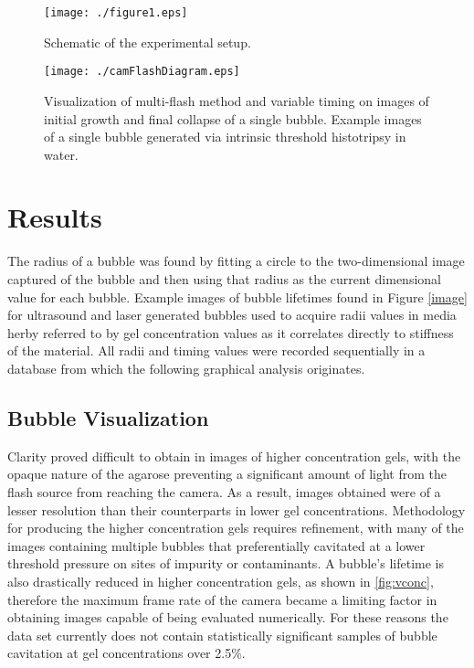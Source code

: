 \documentclass[prl,aps,epsf,twocolumn,superscriptaddress]{revtex4-1}
\begin{document}
\begin{figure}[ht!]
	\begin{center} 
		\texttt{[image: ./figure1.eps]} 
	\end{center}
	\caption{Schematic of the experimental setup.}
	\label{fig:setup}
\end{figure}

\begin{figure}[ht!]
	\begin{center} 
		\texttt{[image: ./camFlashDiagram.eps]} 
	\end{center}
	\caption{Visualization of multi-flash method and variable timing on images of initial growth and final collapse of a single bubble. Example images of a single bubble generated via intrinsic threshold histotripsy in water.}
	\label{fig:camFlash}
\end{figure}

\section{Results}
The radius of a bubble was found by fitting a circle to the two-dimensional image captured of the bubble and then using that radius as the current dimensional value for each bubble. Example images of bubble lifetimes found in Figure \ref{image} for ultrasound and laser generated bubbles used to acquire radii values in media herby referred to by gel concentration values as it correlates directly to stiffness of the material. All radii and timing values were recorded sequentially in a database from which the following graphical analysis originates. 

\subsection{Bubble Visualization} \label{sec:images}

Clarity proved difficult to obtain in images of higher concentration gels, with the opaque nature of the agarose preventing a significant amount of light from the flash source from reaching the camera. As a result, images obtained were of a lesser resolution than their counterparts in lower gel concentrations. Methodology for producing the higher concentration gels requires refinement, with many of the images containing multiple bubbles that preferentially cavitated at a lower threshold pressure on sites of impurity or contaminants. A bubble's lifetime is also drastically reduced in higher concentration gels, as shown in \ref{fig:vconc}, therefore the maximum frame rate of the camera became a limiting factor in obtaining images capable of being evaluated numerically. For these reasons the data set currently does not contain statistically significant samples of bubble cavitation at gel concentrations over 2.5\%. 
\end{document}
